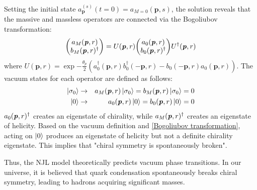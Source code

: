         Setting the initial state $a_{\bm{p}}^{(s)}(t=0) = a_{M=0}(\bm{p},s)$, the solution reveals that the massive and massless operators are connected via the Bogoliubov transformation:  
        \begin{eqnarray}
            \label{Bogoliubov transformation}
            \mqty(a_{M}(\textbf{\textit{p}},r)\\b_{M}(\textbf{\textit{p}},r)^{\dag})=U(\textbf{\textit{p}},r) \mqty(a_0(\textbf{\textit{p}},r)\\b_0(\textbf{\textit{p}},r)^{\dag})U^{\dag}(\textbf{\textit{p}},r)
        \end{eqnarray}
        where $U(\bm{p},r) = \exp{-\frac{\theta_p}{2}(a_0^\dag(\bm{p},r)b_0^\dag(-\bm{p},r) - b_0(-\bm{p},r)a_0(\bm{p},r))}$.  
        The vacuum states for each operator are defined as follows:  
        \begin{eqnarray}
            \ket{\sigma_0} &\rightarrow&a_M(\textbf{\textit{p}},r)\ket{\sigma_0}=b_M(\textbf{\textit{p}},r)\ket{\sigma_0}=0\\
            \ket{0} &\rightarrow& a_0(\textbf{\textit{p}},r)\ket{0}=b_0(\textbf{\textit{p}},r)\ket{0}=0
        \end{eqnarray}
       $a_0(\textbf{\textit{p}},r)^{\dag}$ creates an eigenstate of chirality, while $a_M(\textbf{\textit{p}},r)^{\dag}$ creates an eigenstate of helicity. Based on the vacuum definition and \eqref{Bogoliubov transformation}, acting on $\ket{0}$ produces an eigenstate of helicity but not a definite chirality eigenstate. This implies that "chiral symmetry is spontaneously broken".  
        
        Thus, the NJL model theoretically predicts vacuum phase transitions. In our universe, it is believed that quark condensation spontaneously breaks chiral symmetry, leading to hadrons acquiring significant masses.
